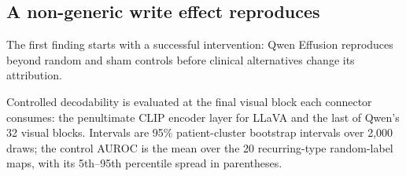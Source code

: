 \documentclass{article}
\begin{document}
\begin{table}[t]
\centering
\setlength{\tabcolsep}{4pt}

\caption{\textbf{Pilot replication on 600 new patients.} Qwen2.5-VL-7B on NIH ChestX-ray14. Per concept: the concept write $W_{q,q}$, the random 95th percentile (p95), the absolute sham, and its rank among the 120 compared effects; blue shades a negative ownership contrast.}
\label{tab:cf-seed}
\end{table}

\subsection{A non-generic write effect reproduces}
\label{sec:qwen-replication}

The first finding starts with a successful intervention: Qwen Effusion reproduces beyond random and sham controls before clinical alternatives change its attribution.

Controlled decodability is evaluated at the final visual block each connector consumes: the penultimate CLIP encoder layer for LLaVA and the last of Qwen's 32 visual blocks. Intervals are 95\% patient-cluster bootstrap intervals over 2,000 draws; the control AUROC is the mean over the 20 recurring-type random-label maps, with its 5th--95th percentile spread in parentheses.
\end{document}
